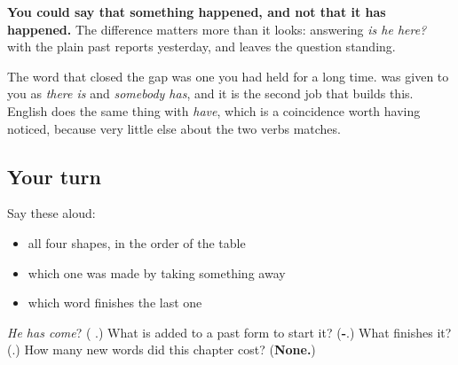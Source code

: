 \begin{grammarlens}[title={What you've built}]
\textbf{You could say that something happened, and not that it has happened.} The difference matters more than it looks: answering \emph{is he here?} with the plain past reports yesterday, and leaves the question standing.

The word that closed the gap was one you had held for a long time. \textbf{} was given to you as \emph{there is} and \emph{somebody has}, and it is the second job that builds this. English does the same thing with \emph{have}, which is a coincidence worth having noticed, because very little else about the two verbs matches.
\end{grammarlens}

\subsection*{Your turn}
Say these aloud:

\begin{itemize}
\raggedright
  \item all four shapes, in the order of the table
  \item which one was made by taking something away
  \item which word finishes the last one
\end{itemize}

\begin{tcolorbox}[breakable,colback=teal!4,colframe=teal!35!black,title={Before you move on}]
\emph{He has come}? (\textbf{ }.) What is added to a past form to start it? (\textbf{-}.) What finishes it? (\textbf{}.) How many new words did this chapter cost? (\textbf{None.})
\end{tcolorbox}
